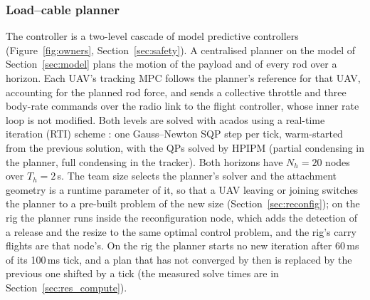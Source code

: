 
\subsubsection{Load--cable planner}
\label{sec:controller}

The controller is a two-level cascade of model predictive controllers (Figure~\ref{fig:owners}, Section~\ref{sec:safety}).
A centralised planner on the model of Section~\ref{sec:model} plans the motion of the payload and of
every rod over a horizon. Each UAV's tracking MPC follows the planner's reference for that UAV,
accounting for the planned rod force, and sends a collective throttle and three body-rate commands
over the radio link to the flight controller, whose inner rate loop is not modified. Both levels are
solved with acados
\cite{verschueren2022acados} using a real-time iteration (RTI) scheme \cite{diehl2002rti}: one
Gauss--Newton SQP step per tick, warm-started from the previous solution, with the QPs solved by
HPIPM \cite{frison2020hpipm} (partial condensing in the planner, full condensing in the tracker).
Both horizons have $N_h = 20$ nodes over $T_h = 2$\,s. The team size selects the planner's solver and the
attachment geometry is a runtime parameter of it, so that a UAV leaving or joining switches the planner to a
pre-built problem of the new size (Section~\ref{sec:reconfig}); on the rig the planner runs inside the
reconfiguration node, which adds the detection of a release and the resize to the same optimal control problem,
and the rig's carry flights are that node's. On the rig the planner starts no new iteration after 60\,ms of its
100\,ms tick, and a plan that has not converged by then is replaced by the previous one shifted by a tick (the measured
solve times are in Section~\ref{sec:res_compute}).

